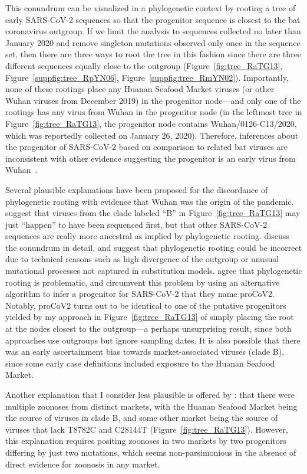\documentclass[9pt,twocolumn,twoside]{gsajnl_modified}
\begin{document}
This conundrum can be visualized in a phylogenetic context by rooting a tree of early SARS-CoV-2 sequences so that the progenitor sequence is closest to the bat coronavirus outgroup.
If we limit the analysis to sequences collected no later than January 2020 and remove singleton mutations observed only once in the sequence set, then there are three ways to root the tree in this fashion since there are three different sequences equally close to the outgroup (Figure~\ref{fig:tree_RaTG13}, Figure~\ref{suppfig:tree_RpYN06}, Figure~\ref{suppfig:tree_RmYN02}).
Importantly, none of these rootings place any Huanan Seafood Market viruses (or other Wuhan viruses from December 2019) in the progenitor node---and only one of the rootings has any virus from Wuhan in the progenitor node (in the leftmost tree in Figure~\ref{fig:tree_RaTG13}, the progenitor node contains Wuhan/0126-C13/2020, which was reportedly collected on January 26, 2020).
Therefore, inferences about the progenitor of SARS-CoV-2 based on comparison to related bat viruses are inconsistent with other evidence suggesting the progenitor is an early virus from Wuhan~\citep{pipes2021assessing}.

Several plausible explanations have been proposed for the discordance of phylogenetic rooting with evidence that Wuhan was the origin of the pandemic.
\citet{rambaut2020dynamic} suggest that viruses from the clade labeled ``B'' in Figure~\ref{fig:tree_RaTG13} may just ``happen'' to have been sequenced first, but that other SARS-CoV-2 sequences are really more ancestral as implied by phylogenetic rooting.
\citet{pipes2021assessing} discuss the conundrum in detail, and suggest that phylogenetic rooting could be incorrect due to technical reasons such as high divergence of the outgroup or unusual mutational processes not captured in substitution models.
\citet{kumar2021evolutionary} agree that phylogenetic rooting is problematic, and circumvent this problem by using an alternative algorithm to infer a progenitor for SARS-CoV-2 that they name proCoV2.
Notably, proCoV2 turns out to be identical to one of the putative progenitors yielded by my approach in Figure~\ref{fig:tree_RaTG13} of simply placing the root at the nodes closest to the outgroup---a perhaps unsurprising result, since both approaches  use outgroups but ignore sampling dates.
It is also possible that there was an early ascertainment bias towards market-associated viruses (clade B), since some early case definitions included exposure to the Huanan Seafood Market.

Another explanation that I consider less plausible is offered by \citet{garry2021early}: that there were multiple zoonoses from distinct markets, with the Huanan Seafood Market being the source of viruses in clade B, and some other market being the source of viruses that lack T8782C and C28144T (Figure~\ref{fig:tree_RaTG13}).
However, this explanation requires positing zoonoses in two markets by two progenitors differing by just two mutations, which seems non-parsimonious in the absence of direct evidence for zoonosis in any market.
\end{document}
